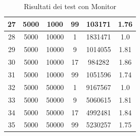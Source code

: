 \documentclass[12pt,a4paper,openright,twoside]{book}
\begin{document}
\begin{table}[h!]
\begin{tabular}{ |c|c|c|c|c|c| }
 \hline
27 & 5000 & 1000 & 99 & 103171 & 1.76 \\ 
 \hline
28 & 5000 & 10000 & 1 & 1831471 & 1.0 \\ 
 \hline
29 & 5000 & 10000 & 9 & 1014055 & 1.81 \\ 
 \hline
30 & 5000 & 10000 & 17 & 984282 & 1.86 \\ 
 \hline
31 & 5000 & 10000 & 99 & 1051596 & 1.74 \\ 
 \hline
32 & 5000 & 50000 & 1 & 9167567 & 1.0 \\ 
 \hline
33 & 5000 & 50000 & 9 & 5060615 & 1.81 \\ 
 \hline
34 & 5000 & 50000 & 17 & 4992481 & 1.84 \\ 
 \hline
35 & 5000 & 50000 & 99 & 5230257 & 1.75 \\ 
 \hline
	\end{tabular}
	\caption{Risultati dei test con Monitor}
	\label{tab:table2}
\end{table}
\end{document}
